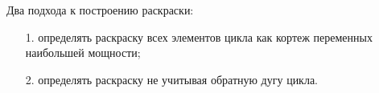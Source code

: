 \documentclass[12pt]{article}
\begin{document}
\begin{minipage}[H]{0.45\linewidth}
Два подхода к построению раскраски:
\begin{itemize}
\item[1.] определять раскраску всех элементов цикла как кортеж переменных наибольшей мощности;
\item[2.] определять раскраску не учитывая обратную дугу цикла.
\end{itemize}
\end{minipage}
\hfill
\begin{minipage}[H]{0.26\linewidth}
\end{minipage}
\hfill
\end{document}
